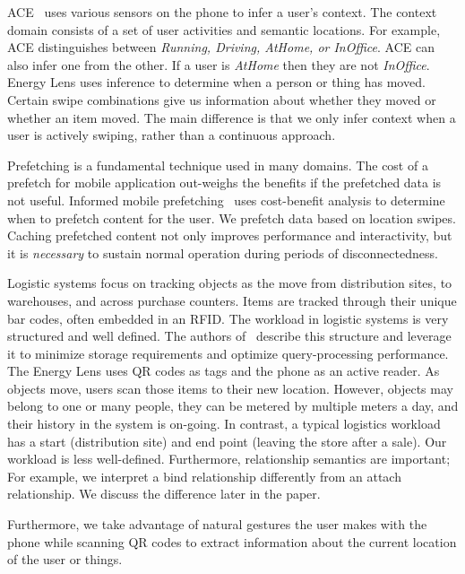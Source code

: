 ACE~\cite{ACE} uses various sensors on the phone to infer a user's context.  The context domain consists of a set of user activities
and semantic locations.  For example, ACE distinguishes between \emph{Running, Driving, AtHome, or InOffice}.  ACE can also infer 
one from the other.  If a user is \emph{ AtHome} then they are not \emph{ InOffice}.  Energy Lens uses inference to determine
when a person or thing has moved.  Certain swipe combinations give us information about whether they moved or
whether an item moved. The main difference is that we only infer context when a user is actively swiping, rather
than a continuous approach.  

Prefetching is a fundamental technique used in many domains.  The cost of a prefetch for mobile
application out-weighs the benefits if the prefetched data is not useful.  Informed mobile prefetching~\cite{imp_mobisys2012} uses cost-benefit analysis 
to determine when to prefetch content for the user.  We prefetch data based on location swipes.
Caching prefetched content not only improves performance and interactivity, but it is \emph{necessary} to sustain normal
operation during periods of disconnectedness.

Logistic systems focus on tracking objects as the move from distribution sites, to warehouses, and across purchase counters.  
Items are tracked through their unique bar codes, often embedded in an RFID.  The workload in logistic systems is very structured 
and well defined.  The authors of~\cite{rfid_gonz2006} describe this structure and leverage it to minimize storage
requirements and optimize query-processing performance.  The Energy Lens uses QR codes as tags and the phone as an active
reader.  As objects move, users scan those items to their new location.  However, objects may belong to one or
many people, they can be metered by multiple meters a day, and their history in the system
is on-going.  In contrast, a typical logistics workload has a start (distribution site) and end point (leaving the store
after a sale).  Our workload is less well-defined.  Furthermore, relationship semantics are important; 
For example, we interpret a bind relationship differently from an attach relationship.  We discuss the difference
later in the paper.

Furthermore, we take advantage of natural gestures the user makes with the phone while scanning QR codes to extract
information about the current location of the user or things.

